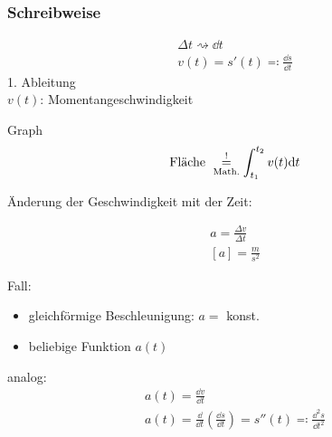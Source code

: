 \subsubsection{Schreibweise}
\begin{gather*}
	\Delta t \rightsquigarrow \dd t \\
	v(t) = s'(t) \eqqcolon \frac{\dd s}{\dd t}
\end{gather*}
1. Ableitung \\
$v(t)$: Momentangeschwindigkeit
\begin{bsp*}[ note = $v$ nimmt gleichmässig zu ]
	Graph
	\[ \text{Fläche } \underset{\text{\scriptsize{Math.}}}{\overset{!}{=}} \int_{t_1}^{t_2} v(t) \dd t \]
\end{bsp*}
Änderung der Geschwindigkeit mit der Zeit:
\begin{def*}[ note = Beschleunigung , index = Beschleunigung ]
	\begin{gather*}
		a = \frac{\Delta v}{\Delta t} \\
		[a] = \frac{m}{s^2}
	\end{gather*}
\end{def*}
Fall:
\begin{itemize}
	\item gleichförmige Beschleunigung: $a =$ konst.
	\item beliebige Funktion $a(t)$
\end{itemize}
analog:
\begin{gather*}
	a(t) = \frac{\dd v}{\dd t} \\
	a(t) = \frac{\dd}{\dd t} \left( \frac{\dd s}{\dd t} \right) = s''(t) \eqqcolon \frac{\dd^2 s}{\dd t^2}
\end{gather*}
